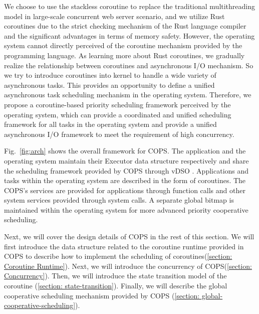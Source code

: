 \documentclass[sigconf,review,anonymous]{acmart}
\begin{document}
We choose to use the stackless coroutine to replace the traditional multithreading model in large-scale concurrent web server scenario, and we utilize Rust coroutines due to the strict checking mechanism of the Rust language compiler and the significant advantages in terms of memory safety. However, the operating system cannot directly perceived of the coroutine mechanism provided by the programming language. As learning more about Rust coroutines, we gradually realize the relationship between coroutines and asynchronous I/O mechanism. So we try to introduce coroutines into kernel to handle a wide variety of asynchronous tasks. This provides an opportunity to define a unified asynchronous task scheduling mechanism in the operating system. Therefore, we propose a coroutine-based priority scheduling framework perceived by the operating system, which can provide a coordinated and unified scheduling framework for all tasks in the operating system and provide a unified asynchronous I/O framework to meet the requirement of high concurrency.


Fig.~\ref{fig:arch} shows the overall framework for COPS. The application and the operating system maintain their Executor data structure respectively and share the scheduling framework provided by COPS through vDSO \cite{michael_kerrisk_vdso7_2023}. Applications and tasks within the operating system are described in the form of coroutines. The COPS's services are provided for applications through function calls and other system services provided through system calls. A separate global bitmap is maintained within the operating system for more advanced priority cooperative scheduling.

Next, we will cover the design details of COPS in the rest of this section. We will first introduce the data structure related to the coroutine runtime provided in COPS to describe how to implement the scheduling of coroutines(\ref{section: Coroutine Runtime}). Next, we will introduce the concurrency of COPS(\ref{section: Concurrency}). Then, we will introduce the state transition model of the coroutine (\ref{section: state-transition}). Finally, we will describe the global cooperative scheduling mechanism provided by COPS (\ref{section: global-cooperative-scheduling}).
\end{document}
